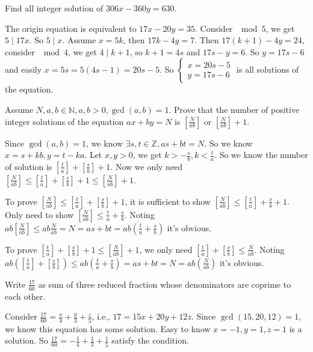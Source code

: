 \documentclass{ctexart}
\begin{document}
\begin{problem}\label{pro:p23.1.b}
  Find all integer solution of \(306x-360y=630\).
\end{problem}
\begin{solution}
  The origin equation is equivalent to \(17x-20y=35\).
  Consider \(\mod 5\), we get \(5 \mid 17 x\). So \(5 \mid x\).
  Assume \(x=5k\), then \(17k-4y=7\).
  Then \(17(k+1)-4y=24\), consider \(\mod 4\), we get \(4 \mid k+1\), so \(k+1=4s\) and \(17s-y=6\).
  So \(y=17s-6\) and easily \(x=5s=5(4s-1)=20s-5\).
  So \(\begin{cases}
    x=20s-5 \\
    y=17s-6
  \end{cases}\) is all solutions of the equation.
\end{solution}
\begin{problem}\label{pro:p23.3}
  Assume \(N,a,b \in \mathbb{N},a,b>0,\gcd(a,b)=1\).
  Prove that the number of positive integer solutions of the equation \(ax+by=N\)
  is \(\left[\frac{N}{ab}\right]\) or \(\left[\frac{N}{ab}\right]+1\).
\end{problem}

\begin{solution}
  Since \(\gcd(a,b)=1\), we know \(\exists s,t \in \mathbb{Z},as+bt=N\).
  So we know \(x=s+kb,y=t-ka\). Let \(x,y>0\), we get \(k> -\frac{s}{b},k<\frac{t}{a}\).
  So we know the number of solution is \(\left[\frac{t}{a}\right]+\left[\frac{s}{b}\right]+1\).
  Now we only need \(\left[\frac{N}{ab}\right]\leq\left[\frac{t}{a}\right]+\left[\frac{s}{b}\right]+1 \leq \left[\frac{N}{ab}\right]+1\).

  To prove \(\left[\frac{N}{ab}\right]\leq\left[\frac{t}{a}\right]+\left[\frac{s}{b}\right]+1\), it is sufficient to show
  \(\left[\frac{N}{ab}\right]\leq\left[\frac{t}{a}\right]+\frac{s}{b}+1\).
  Only need to show \(\left[\frac{N}{ab}\right]\leq\frac{t}{a}+\frac{s}{b}\).
  Noting \(ab \left[\frac{N}{ab}\right] \leq ab \frac{N}{ab}=N=as+bt=ab(\frac{t}{a}+\frac{s}{b})\) it's obvious.

  To prove \(\left[\frac{t}{a}\right]+\left[\frac{s}{b}\right]+1 \leq \left[\frac{N}{ab}\right]+1\),
  we only need \(\left[\frac{t}{a}\right]+\left[\frac{s}{b}\right] \leq \frac{N}{ab}\).
  Noting \(ab(\left[\frac{t}{a}\right]+\left[\frac{s}{b}\right]) \leq ab(\frac{t}{a}+\frac{s}{b})=as+bt=N=ab(\frac{N}{ab})\) it's obvious.
\end{solution}
\begin{problem}\label{pro:p24.2}
  Write \(\frac{17}{60}\) as sum of three reduced fraction whose denominators are coprime to each other.
\end{problem}
\begin{solution}
  Consider \(\frac{17}{60}=\frac{x}{4}+\frac{y}{3}+\frac{z}{5}\), i.e., \(17=15x+20y+12z\).
  Since \(\gcd(15,20,12)=1\), we know this equation has some solution.
  Easy to know \(x=-1,y=1,z=1\) is a solution.
  So \(\frac{17}{60}=-\frac{1}{4}+\frac{1}{3}+\frac{1}{5}\) satisfy the condition.
\end{solution}
\end{document}
